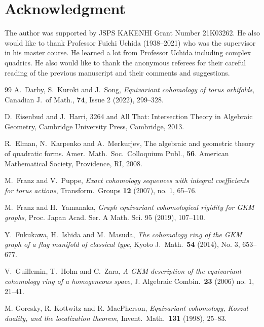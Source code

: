 \documentclass[12pt]{amsart}
\theoremstyle{remark}
\numberwithin{equation}{section}
\begin{document}
\section*{Acknowledgment}
The author was supported by JSPS KAKENHI Grant Number 21K03262.
He also would like to thank Professor Fuichi Uchida (1938--2021) who 
was the supervisor in his master course. 
He learned a lot from Professor Uchida including complex quadrics. 
He also would like to thank the anonymous referees for their careful reading of the previous manuscript and their comments and suggestions.


\begin{thebibliography}{99}
A.~Darby, S.~Kuroki and J.~Song, 
\emph{Equivariant cohomology of torus orbifolds}, 
Canadian J.~of Math., \textbf{74}, Issue 2 (2022), 299--328.

D.~Eisenbud and J.~Harri,
3264 and All That: Intersection Theory in Algebraic Geometry, 
Cambridge University Press, Cambridge, 2013.

R.~Elman, N.~Karpenko and A.~Merkurjev,
The algebraic and geometric theory of quadratic forms. 
Amer.~Math.~Soc.~Colloquium Publ., \textbf{56}. 
American Mathematical Society, Providence, RI, 2008.

M.~Franz and V.~Puppe, 
\emph{Exact cohomology sequences with integral coefficients for torus actions}, Transform.~Groups \textbf{12} (2007), no. 1, 65--76.

M.~Franz and H.~Yamanaka, 
\emph{Graph equivariant cohomological rigidity for GKM graphs},
Proc. Japan Acad. Ser. A Math. Sci. 95 (2019), 107--110.

Y.~Fukukawa, H.~Ishida and M.~Masuda, 
\emph{The cohomology ring of the GKM graph of a flag manifold of classical
type}, Kyoto J.~Math.~\textbf{54} (2014), No. 3, 653--677.

V.~Guillemin, T.~Holm and C.~Zara, 
\emph{A GKM description of the equivariant cohomology ring of a homogeneous
space}, J. Algebraic Combin.~\textbf{23} (2006) no. 1, 21--41.

M. Goresky, R. Kottwitz and R. MacPherson, 
\emph{Equivariant cohomology, Koszul duality, and the localization theorem},
Invent.~Math.~\textbf{131} (1998), 25--83.


\end{thebibliography}
\end{document}

